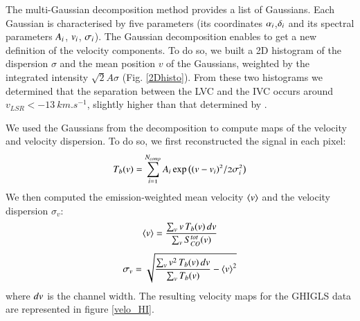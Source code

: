 \documentclass[traditabstract]{aa}
\begin{document}
   The multi-Gaussian decomposition method provides a list of Gaussians. Each Gaussian is characterised by five parameters (its coordinates $\mathnormal{\alpha_i}$,$\mathnormal{\delta_i}$ and its spectral parameters $\mathnormal{A_i}$, $\mathnormal{v_i}$, $\mathnormal{\sigma_i}$). The Gaussian decomposition enables to get a new definition of the velocity components. To do so, we built a 2D histogram of the dispersion $\sigma$ and the mean position $v$ of the Gaussians, weighted by the integrated intensity $\sqrt{2}A\sigma$ (Fig. \ref{2Dhisto}). From these two histograms we determined that the separation between the LVC and the IVC occurs around $v_{LSR}<-13\: km.s^{-1}$, slightly higher than that determined by \cite{Planck_XXIV_2011}.

   We used the Gaussians from the decomposition to compute maps of the velocity and velocity dispersion. To do so, we first reconstructed the signal in each pixel:
\begin{equation}
  \mathnormal{T_b(v)=\sum_{i=1}^{N_{comp}} A_i \exp\left( (v-v_i)^2/2\sigma_i^2 \right)}
\end{equation}
%
We then computed the emission-weighted mean velocity $\left< v \right>$ and the velocity dispersion $\sigma_v$:
\begin{equation}
  \mathnormal{\left< v \right>=\frac{\sum_v v\, T_b(v)\, dv}{\sum_v S_{CO}^{tot}(v)}}
\end{equation}
\begin{equation}
  \mathnormal{\sigma_v=\sqrt{\frac{\sum_v v^2\, T_b(v)\, dv}{\sum_v T_b(v)}-\left< v \right>^2}}
\end{equation} 
where $\mathnormal{dv}$ is the channel width. The resulting velocity maps for the GHIGLS data are represented in figure \ref{velo_HI}.
\end{document}
